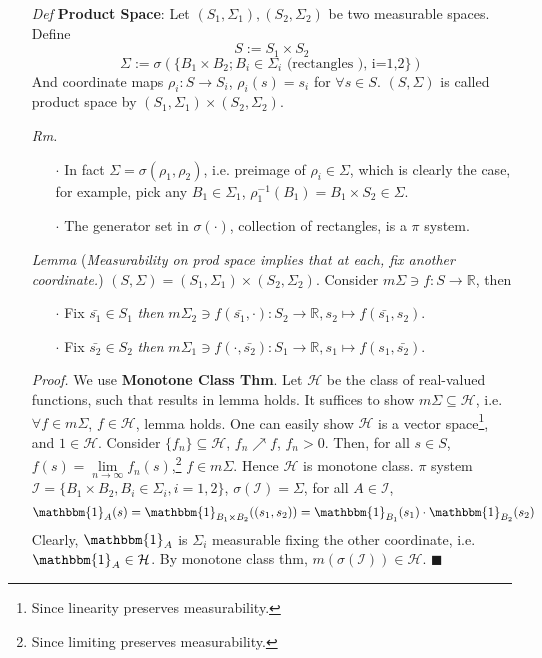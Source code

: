 \documentclass[a4paper,12pt,twoside]{book}
\begin{document}
\begin{itemize}
	\item[\textit{Def}] \textbf{Product Space}: Let $(S_1, \Sigma_1), (S_2, \Sigma_2)$ be two measurable spaces. Define
	$$S:=S_1 \times S_2$$
	$$\Sigma := \sigma(\{B_1 \times B_2; B_i \in \Sigma_i \text{ (rectangles ), i=1,2}\})$$
	And coordinate maps $\rho_i: S \to S_i$, $\rho_i(s)=s_i$ for $\forall s \in S$. $(S, \Sigma)$ is called product space by $(S_1, \Sigma_1)\times (S_2, \Sigma_2)$. 

	\item[\textit{Rm.}] 
	\begin{itemize}
		\item[$\cdot$] In fact $\Sigma=\sigma(\rho_1, \rho_2)$, i.e. preimage of $\rho_i \in \Sigma$, which is clearly the case, for example, pick any $B_1\in \Sigma_1$, $\rho_1^{-1}(B_1)=B_1 \times S_2 \in \Sigma$.
		\item[$\cdot$] The generator set in $\sigma(\cdot)$, collection of rectangles, is a $\pi$ system.
	\end{itemize}

	\item[\textit{Lemma}] (\textit{Measurability on prod space implies that at each, fix another coordinate.}) $(S, \Sigma)=(S_1, \Sigma_1)\times(S_2, \Sigma_2)$. Consider $m\Sigma\ni f:S\to \mathbb{R}$, then
	\begin{itemize}
		\item[$\cdot$] Fix $\bar{s_1}\in S_1$ \textit{then} $m\Sigma_2 \ni f(\bar{s_1}, \cdot): S_2 \to \mathbb{R}, s_2 \mapsto f(\bar{s_1}, s_2)$.
		\item[$\cdot$] Fix $\bar{s_2}\in S_2$ \textit{then} $m\Sigma_1 \ni f(\cdot, \bar{s_2}): S_1 \to \mathbb{R}, s_1 \mapsto f(s_1, \bar{s_2})$.
	\end{itemize}

	\item[\textit{Proof. }] We use \textbf{Monotone Class Thm}. Let $\mathcal{H}$ be the class of real-valued functions, such that results in lemma holds. It suffices to show $ m\Sigma \subseteq \mathcal{H}$, i.e. $\forall f \in m\Sigma$, $f\in \mathcal{H}$, lemma holds.\newline
	One can easily show $\mathcal{H}$ is a vector space\footnote{Since linearity preserves measurability.}, and $1\in \mathcal{H}$.\newline
	Consider $\{f_n\} \subseteq \mathcal{H}$, $f_n \nearrow f$, $f_n >0$. Then, for all $s \in S$, $f(s) =\lim\limits_{n\rightarrow\infty} f_n(s)$,\footnote{Since limiting preserves measurability.} $f\in m\Sigma$. Hence $\mathcal{H}$ is monotone class. \newline
	$\pi$ system $\mathcal{I}=\{B_1 \times B_2, B_i \in \Sigma_i, i=1,2\}$, $\sigma(\mathcal{I})=\Sigma$, for all $A \in \mathcal{I}$, 
	\begin{equation}
		\mathbbm{1}_{A}(s)=\mathbbm{1}_{B_1 \times B_2}((s_1, s_2))=\mathbbm{1}_{B_1}(s_1) \cdot \mathbbm{1}_{B_2}(s_2)
	\end{equation}
	Clearly, $\mathbbm{1}_{A}$ is $\Sigma_i$ measurable fixing the other coordinate, i.e. $\mathbbm{1}_{A}\in \mathcal{H}$. By monotone class thm, $m(\sigma(\mathcal{I}))\in \mathcal{H}$. $\blacksquare$
\end{itemize}
\end{document}
